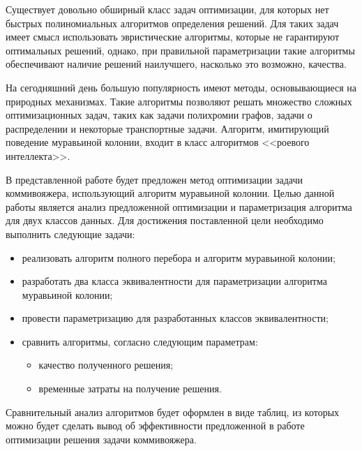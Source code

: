 \setcounter{page}{2}

Существует довольно обширный класс задач оптимизации, для которых нет быстрых полиномиальных алгоритмов определения решений. Для таких задач имеет смысл использовать эвристические алгоритмы\cite{ant-cause}, которые не гарантируют оптимальных решений, однако, при правильной параметризации такие алгоритмы обеспечивают наличие решений наилучшего, насколько это возможно, качества.

На сегодняшний день большую популярность имеют методы, основывающиеся на природных механизмах. Такие алгоритмы позволяют решать множество сложных оптимизационных задач, таких как задачи полихромии графов, задачи о распределении и некоторые транспортные задачи. Алгоритм, имитирующий поведение муравьиной колонии, входит в класс алгоритмов <<роевого интеллекта>>\cite{colony}. 

В представленной работе будет предложен метод оптимизации задачи коммивояжера, использующий алгоритм муравьиной колонии. Целью данной работы является анализ предложенной оптимизации и параметризация алгоритма для двух классов данных. Для достижения поставленной цели необходимо выполнить следующие задачи:
\begin{itemize}
	\item реализовать алгоритм полного перебора и алгоритм муравьиной колонии;
	\item разработать два класса эквивалентности для параметризации алгоритма муравьиной колонии;
	\item провести параметризацию для разработанных классов эквивалентности;
	\item сравнить алгоритмы, согласно следующим параметрам:
	\begin{itemize}
		\item качество полученного решения;
		\item временные затраты на получение решения.
	\end{itemize}
\end{itemize}
Сравнительный анализ алгоритмов будет оформлен в виде таблиц, из которых можно будет сделать вывод об эффективности предложенной в работе оптимизации решения задачи коммивояжера.